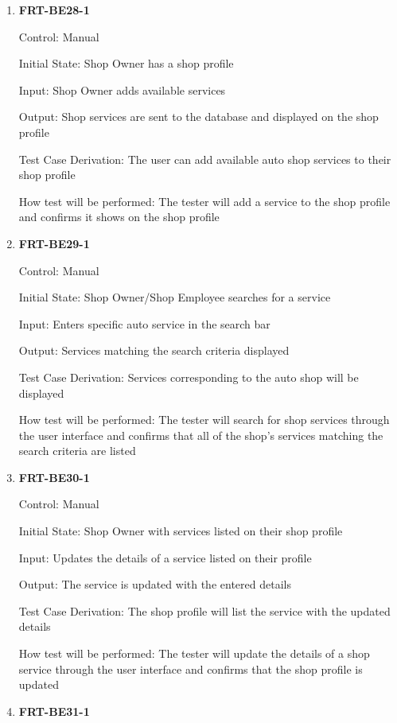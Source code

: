 \documentclass[12pt, titlepage]{article}
\begin{document}
\begin{enumerate}

	\item \textbf{FRT-BE28-1}

	      Control: Manual

	      Initial State: Shop Owner has a shop profile

	      Input: Shop Owner adds available services

	      Output: Shop services are sent to the database and displayed on the shop profile

	      Test Case Derivation: The user can add available auto shop services to their shop profile

	      How test will be performed: The tester will add a service to the shop profile and confirms it shows
	      on the shop profile

	\item \textbf{FRT-BE29-1}

	      Control: Manual

	      Initial State: Shop Owner/Shop Employee searches for a service

	      Input: Enters specific auto service in the search bar

	      Output: Services matching the search criteria displayed

	      Test Case Derivation: Services corresponding to the auto shop will be displayed

	      How test will be performed: The tester will search for shop services through the user interface and
	      confirms that all of the shop's services matching the search criteria are listed

	\item \textbf{FRT-BE30-1}

	      Control: Manual

	      Initial State: Shop Owner with services listed on their shop profile

	      Input: Updates the details of a service listed on their profile

	      Output: The service is updated with the entered details

	      Test Case Derivation: The shop profile will list the service with the updated details

	      How test will be performed: The tester will update the details of a shop service through the user
	      interface and confirms that the shop profile is updated

	\item \textbf{FRT-BE31-1}


\end{enumerate}
\end{document}
